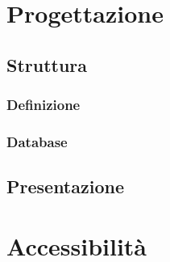\newpage
\section{Progettazione}
	\subsection{Struttura}
		\subsubsection{Definizione}
		\subsubsection{Database}
	\subsection{Presentazione}

\newpage
\section{Accessibilit\`a}
		
